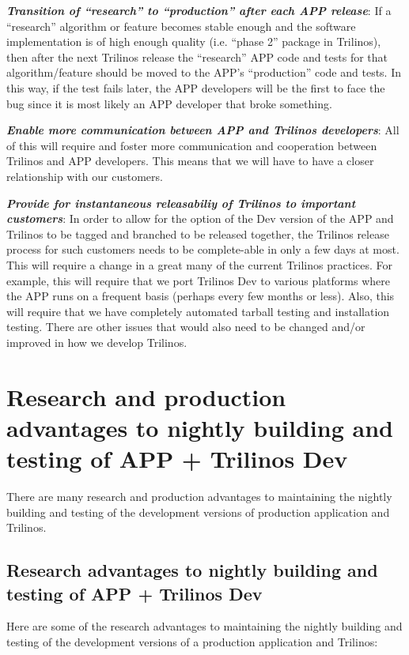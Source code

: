 \documentclass[pdf,ps2pdf,11pt]{SANDreport}
\begin{document}
{}\textit{\textbf{Transition of ``research'' to ``production'' after each APP
release}}: If a ``research'' algorithm or feature becomes stable enough and
the software implementation is of high enough quality (i.e. ``phase 2''
package in Trilinos), then after the next Trilinos release the ``research''
APP code and tests for that algorithm/feature should be moved to the APP's
``production'' code and tests.  In this way, if the test fails later, the APP
developers will be the first to face the bug since it is most likely an APP
developer that broke something.

{}\textit{\textbf{Enable more communication between APP and Trilinos developers}}:
All of this will require and foster more communication and cooperation between
Trilinos and APP developers.  This means that we will have to have a closer
relationship with our customers.

{}\textit{\textbf{Provide for instantaneous releasabiliy of Trilinos to important
customers}}: In order to allow for the option of the Dev version of the APP and
Trilinos to be tagged and branched to be released together, the Trilinos
release process for such customers needs to be complete-able in only a few days
at most.  This will require a change in a great many of the current Trilinos
practices.  For example, this will require that we port Trilinos Dev to
various platforms where the APP runs on a frequent basis (perhaps every few
months or less).  Also, this will require that we have completely automated
tarball testing and installation testing.  There are other issues that would
also need to be changed and/or improved in how we develop Trilinos.


%
{}\section{Research and production advantages to nightly building and testing
of APP + Trilinos Dev}
%

There are many research and production advantages to maintaining the nightly
building and testing of the development versions of production application and
Trilinos.


%
{}\subsection{Research advantages to nightly building and testing of APP +
Trilinos Dev}
%

Here are some of the research advantages to maintaining the nightly building
and testing of the development versions of a production application and
Trilinos:
\end{document}
